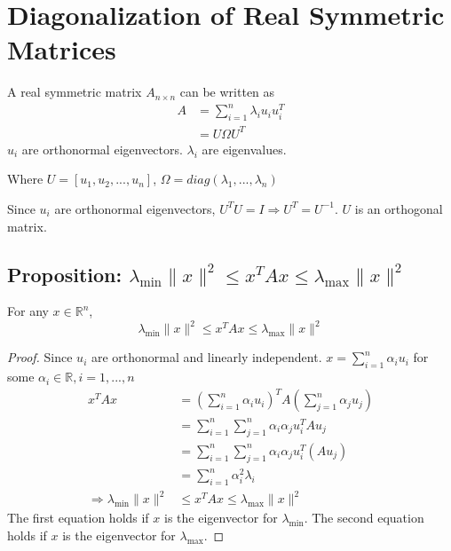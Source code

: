 \documentclass[11pt]{elegantbook}
\begin{document}
\section{Diagonalization of Real Symmetric Matrices}
A real symmetric matrix $A_{n\times n}$ can be written as
\begin{equation}
    \begin{aligned}
        A&=\sum_{i=1}^n\lambda_i u_iu_i^T\\
        &=U\Omega U^T
    \end{aligned}
    \nonumber
\end{equation}
$u_i$ are orthonormal eigenvectors. $\lambda_i$ are eigenvalues.

Where $U=[u_1,u_2,...,u_n]$, $\Omega=diag(\lambda_1,...,\lambda_n)$

Since $u_i$ are orthonormal eigenvectors, $U^TU=I \Rightarrow U^T=U^{-1}$. $U$ is an orthogonal matrix.

\subsection{Proposition: $\lambda_{\min}\|x\|^2\leq x^TAx\leq \lambda_{\max}\|x\|^2$}
\begin{proposition}
For any $x\in \mathbb{R}^n$, $$\lambda_{\min}\|x\|^2\leq x^TAx\leq \lambda_{\max}\|x\|^2$$
\end{proposition}
\begin{proof}
    Since $u_i$ are orthonormal and linearly independent. $x=\sum_{i=1}^n\alpha_i u_i$ for some $\alpha_i\in \mathbb{R},i=1,...,n$
    \begin{equation}
        \begin{aligned}
            x^TAx&=(\sum_{i=1}^n\alpha_i u_i)^TA(\sum_{j=1}^n\alpha_j u_j)\\
            &=\sum_{i=1}^n\sum_{j=1}^n\alpha_i \alpha_ju_i^TAu_j\\
            &=\sum_{i=1}^n\sum_{j=1}^n\alpha_i \alpha_ju_i^T(Au_j)\\
            &=\sum_{i=1}^n\alpha_i^2\lambda_i\\
            \Rightarrow	\lambda_{\min}\|x\|^2&\leq x^TAx\leq \lambda_{\max}\|x\|^2
        \end{aligned}
        \nonumber
    \end{equation}
    The first equation holds if $x$ is the eigenvector for $\lambda_{\min}$. The second equation holds if $x$ is the eigenvector for $\lambda_{\max}$.
\end{proof}
\end{document}
